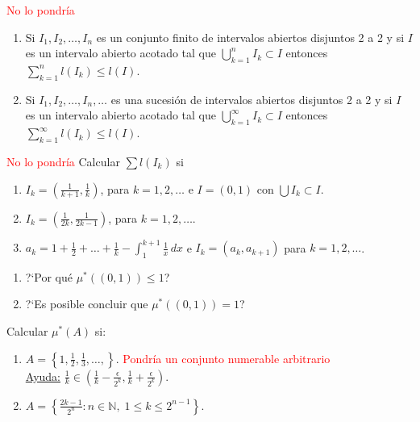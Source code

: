 \documentclass{book}
\newcommand{\nn}{\mathbb{N}}
\begin{document}
\begin{ejer}{} 
\textcolor{red}{No lo pondría}
\begin{enumerate}
\item Si $I_1,I_2,\dots,I_n$ es un conjunto finito de intervalos abiertos disjuntos 2 a 2 y si 
$I$ es un intervalo abierto acotado  tal que $\bigcup\limits_{k=1}^n I_k\subset I$ entonces
$\sum\limits_{k=1}^n l(I_k) \leq l(I).$
\item Si $I_1,I_2,\dots,I_n,\dots$ es una sucesión de intervalos abiertos disjuntos 2 a 2 y si 
$I$ es un intervalo abierto acotado  tal que $\bigcup\limits_{k=1}^{\infty} I_k\subset I$ entonces
$\sum\limits_{k=1}^{\infty} l(I_k) \leq l(I).$
\end{enumerate}
\end{ejer}  

\begin{ejer}{}

\textcolor{red}{No lo pondría}
Calcular $\sum l(I_k)$ si
\begin{enumerate}
\item $I_k=\left(\frac{1}{k+1},\frac{1}{k}\right)$, para $k=1,2,\dots$ e $I=(0,1)$  con $\bigcup I_k\subset I$.
\item $I_k=\left(\frac{1}{2k},\frac{1}{2k-1}\right)$, para $k=1,2,\dots$.
\item $a_k=1+\frac{1}{2}+\dots+\frac{1}{k}-\int_1^{k+1} \frac{1}{x}\,dx $ e $I_k=(a_k,a_{k+1})$ para $k=1,2,\dots$.
\end{enumerate}
\end{ejer}  



\begin{ejer}{}\begin{enumerate}
\textcolor{red}{No lo pondría}
\item ?`Por qu\'e $\mu^*((0,1))\leq 1$?
\item ?`Es posible concluir que  $\mu^*((0,1))= 1$?
\end{enumerate}
\end{ejer}



\begin{ejer}{}  Calcular $\mu^*(A)$ si:
\begin{enumerate}
\item $A=\left\{1,\frac{1}{2},\frac{1}{3},\dots,\right\}$. \textcolor{red}{Pondría un conjunto numerable arbitrario}
\\
\underline{Ayuda:} $\frac{1}{k}\in \left(\frac{1}{k}-\frac{\epsilon}{2^k},\frac{1}{k}+\frac{\epsilon}{2^k}\right)$.
\item $A=\left\{\frac{2k-1}{2^n}:n\in\nn,\;1\leq k\leq 2^{n-1} \right\}$.
\end{enumerate}
\end{ejer}  
\end{document}
